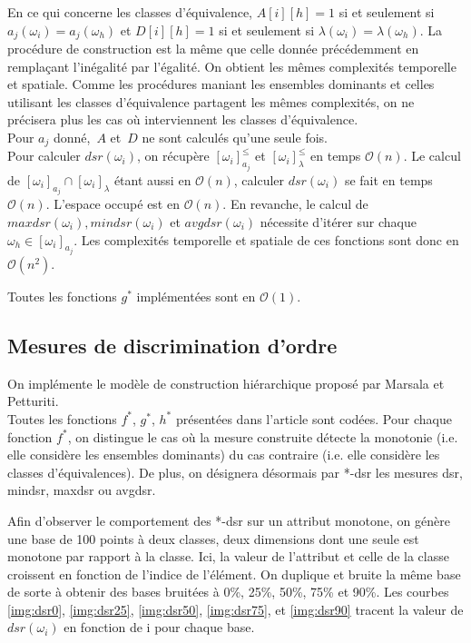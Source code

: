 \documentclass[a4paper]{article}
\begin{document}
En ce qui concerne les classes d'équivalence, $A[i][h]
= 1$ si et seulement si $a_j(\omega_i) =
a_j(\omega_h)$ et $D[i][h] = 1$ si et seulement si $\lambda(\omega_i)
= \lambda(\omega_h)$. La procédure de construction est la même que celle donnée
précédemment en remplaçant l'inégalité par l'égalité. On obtient les mêmes
complexités temporelle et spatiale. Comme les procédures maniant les ensembles
dominants et celles utilisant les classes d'équivalence partagent les mêmes
complexités, on ne précisera plus les cas où interviennent les classes
d'équivalence. \\

Pour $a_j$ donné,~$A$ et~$D$ ne sont calculés qu'une seule fois. \\

Pour calculer $dsr(\omega_i)$, on récupère $[\omega_i]^{\leq}_{a_j}$ et
$[\omega_i]^{\leq}_{\lambda}$ en temps $\mathcal{O}(n)$. Le calcul de
$[\omega_i]_{a_j} \cap [\omega_i]_{\lambda}$ étant aussi en $\mathcal{O}(n)$,
calculer $dsr(\omega_i)$ se fait en temps $\mathcal{O}(n)$. L'espace occupé est
en $\mathcal{O}(n)$.  En revanche, le calcul de $maxdsr(\omega_i), mindsr(\omega_i)$ et
$avgdsr(\omega_i)$ nécessite d'itérer sur chaque $\omega_h \in
[\omega_i]_{a_j}$. Les complexités temporelle et spatiale de ces fonctions sont
donc en $\mathcal{O}(n^2).$

Toutes les fonctions $g^*$ implémentées sont en $\mathcal{O}(1)$.



\subsection{Mesures de discrimination d'ordre} On implémente le modèle de
construction hiérarchique proposé par Marsala et Petturiti.\\ Toutes les
fonctions $f^*$, $g^*$, $h^*$ présentées dans l'article sont codées.  Pour
chaque fonction $f^*$, on distingue le cas où la mesure construite détecte la
monotonie (i.e. elle considère les ensembles dominants) du cas contraire (i.e.
elle considère les classes d'équivalences). De plus, on désignera désormais par
*-dsr les mesures dsr, mindsr, maxdsr ou avgdsr.

Afin d'observer le comportement des *-dsr sur un attribut monotone, on génère
une base de 100 points à deux classes, deux dimensions dont une seule est
monotone par rapport à la classe.  Ici, la valeur de l'attribut et celle de la
classe croissent en fonction de l'indice de l'élément. On duplique et bruite la
même base de sorte à obtenir des bases bruitées à 0\%, 25\%, 50\%, 75\% et 90\%.
Les courbes \ref{img:dsr0}, \ref{img:dsr25}, \ref{img:dsr50}, \ref{img:dsr75},
et \ref{img:dsr90} tracent la valeur de $dsr(\omega_i)$ en fonction de i pour
chaque base. \\
\end{document}
